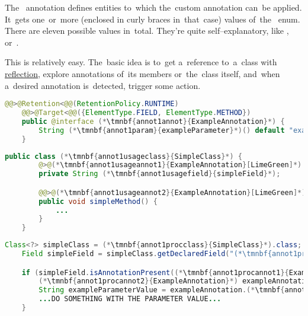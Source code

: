 The~ annotation defines entities to~which the~custom annotation can~be applied.
It~gets one~or~more (enclosed in curly braces in~that~case) values of~the~ enum.
There are eleven possible values in~total.
They're quite self--explanatory, like ,  or~.

This is relatively easy.
The~basic idea is to~get a~reference to~a~class with \hyperref[reflection]{reflection}, explore annotations of~its members or~the~class itself, and~when a~desired annotation is~detected, trigger some action.

\example
\begin{lstlisting}[language=Java, title={Annotation processed during runtime, applicable to fields and methods}]
    @@>@Retention<@@(RetentionPolicy.RUNTIME)
    @@>@Target<@@({ElementType.FIELD, ElementType.METHOD})
    public @interface (*\tmnbf{annot1annot}{ExampleAnnotation}*) {
        String (*\tmnbf{annot1param}{exampleParameter}*)() default "example default value";
    }
\end{lstlisting}
\begin{lstlisting}[language=Java, title={Annotation usage}]
    public class (*\tmnbf{annot1usageclass}{SimpleClass}*) {
        @>@(*\tmnbf{annot1usageannot1}{ExampleAnnotation}[LimeGreen]*)
        private String (*\tmnbf{annot1usagefield}{simpleField}*);

        @@>@(*\tmnbf{annot1usageannot2}{ExampleAnnotation}[LimeGreen]*)<@@((*\tmnbf{annot1usageparam}{exampleParameter}*) = "new value")
        public void simpleMethod() {
            ...
        }
    }
\end{lstlisting}
\begin{lstlisting}[language=Java, title={Runtime annotation processing}]
    Class<?> simpleClass = (*\tmnbf{annot1procclass}{SimpleClass}*).class;
    Field simpleField = simpleClass.getDeclaredField("(*\tmnbf{annot1procfield}{simpleField}[ForestGreen]*)");

    if (simpleField.isAnnotationPresent((*\tmnbf{annot1procannot1}{ExampleAnnotation}*).class)) {
        (*\tmnbf{annot1procannot2}{ExampleAnnotation}*) exampleAnnotation = simpleField.getAnnotation((*\tmnbf{annot1procannot3}{ExampleAnnotation}*).class);
        String exampleParameterValue = exampleAnnotation.(*\tmnbf{annot1procparam}{exampleParameter}*)();
        ...DO SOMETHING WITH THE PARAMETER VALUE...
    }
\end{lstlisting}
